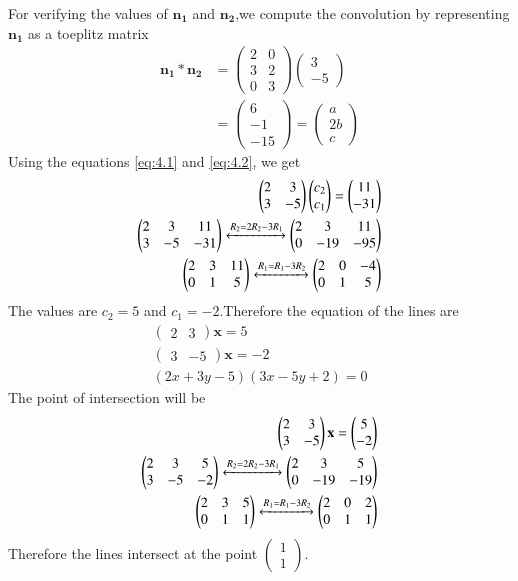 \documentclass[journal,12pt,twocolumn]{IEEEtran}
\providecommand{\brak}[1]{\ensuremath{\left(#1\right)}}
\newcommand{\myvec}[1]{\ensuremath{\begin{pmatrix}#1\end{pmatrix}}}
\numberwithin{equation}{subsection}
\let\vec\mathbf
\begin{document}
For verifying the values of $\vec{n_1}$ and $\vec{n_2}$,we compute the convolution by representing $\vec{n_1}$ as a toeplitz matrix
\begin{align}
    \vec{n_1}\ast \vec{n_2}&=\myvec{2&0\\3&2\\0&3}\myvec{3\\-5}\\
    &=\myvec{6\\-1\\-15}=\myvec{a\\2b\\c}
\end{align}
Using the equations \eqref{eq:4.1} and \eqref{eq:4.2}, we get
\begin{align}
    \myvec{2&3\\3&-5}\myvec{c_2\\c_1}=\myvec{11\\-31}\\
    \myvec{2&3&11\\3&-5&-31}\xleftrightarrow{R_2=2R_2-3R_1}\myvec{2&3&11\\0&-19&-95}\\
    \myvec{2&3&11\\0&1&5}\xleftrightarrow{R_1=R_1-3R_2}\myvec{2&0&-4\\0&1&5}
\end{align}
The values are $c_2=5$ and $c_1=-2$.Therefore the equation of the lines are
\begin{align}
    \myvec{2&3}\vec{x}=5\\
    \myvec{3&-5}\vec{x}=-2\\
    \brak{2x+3y-5}\brak{3x-5y+2}=0
\end{align}
The point of intersection will be 
\begin{align}
    \myvec{2&3\\3&-5}\vec{x}=\myvec{5\\-2}\\
    \myvec{2&3&5\\3&-5&-2}\xleftrightarrow{R_2=2R_2-3R_1}\myvec{2&3&5\\0&-19&-19}\\
    \myvec{2&3&5\\0&1&1}\xleftrightarrow{R_1=R_1-3R_2}\myvec{2&0&2\\0&1&1}
\end{align}
Therefore the lines intersect at the point $\myvec{1\\1}$.
\end{document}
